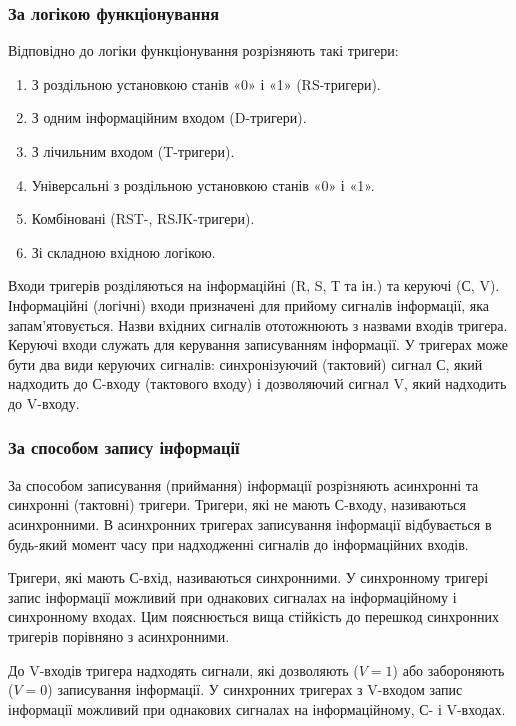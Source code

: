 \documentclass[a4paper,oneside,DIV=10,12pt]{scrartcl}
\begin{document}
			\subsubsection{За логікою функціонування}
				Відповідно до логіки функціонування розрізняють такі тригери:
				\begin{enumerate}
					\item З роздільною установкою станів «0» і «1» (RS-тригери).
					\item З одним інформаційним входом (D-тригери).
					\item З лічильним входом (T-тригери).
					\item Універсальні з роздільною установкою станів «0» і «1».
					\item Комбіновані (RST-, RSJK-тригери).
					\item Зі складною вхідною логікою.
				\end{enumerate}
				
				Входи тригерів розділяються на інформаційні (R, S, Т та ін.) та керуючі (С, V). Інформаційні (логічні) входи призначені для прийому сигналів інформації, яка запам'ятовується. Назви вхідних сигналів ототожнюють з назвами входів тригера. Керуючі входи служать для керування записуванням інформації. У тригерах може бути два види керуючих сигналів: синхронізуючий (тактовий) сигнал С, який надходить до С-входу (тактового входу) і дозволяючий сигнал V, який надходить до V-входу.
			
			\subsubsection{За способом запису інформації}
				За способом записування (приймання) інформації розрізняють асинхронні та синхронні (тактовні) тригери. Тригери, які не мають С-входу, називаються асинхронними. В асинхронних тригерах записування інформації відбувається в будь-який момент часу при надходженні сигналів до інформаційних входів.
				
				Тригери, які мають С-вхід, називаються синхронними. У синхронному тригері запис інформації можливий при однакових сигналах на інформаційному і синхронному входах. Цим пояснюється вища стійкість до перешкод синхронних тригерів порівняно з асинхронними.
				
				До V-входів тригера надходять сигнали, які дозволяють ($V = 1$) або забороняють ($V = 0$) записування інформації. У синхронних тригерах з V-входом запис інформації можливий при однакових сигналах на інформаційному, С- і V-входах.
			
\end{document}
